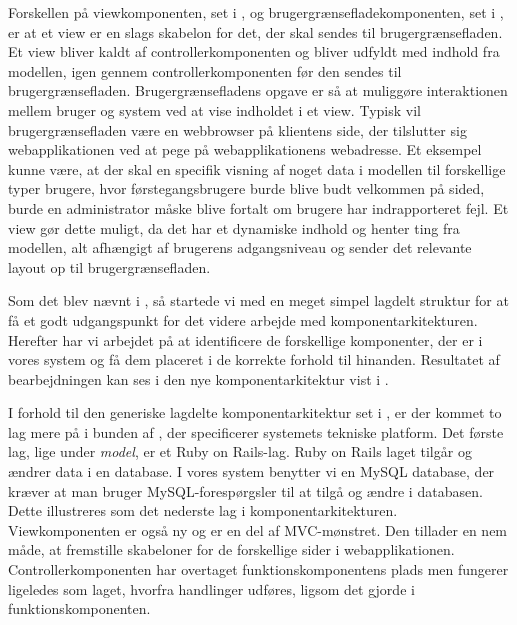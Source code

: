 
Forskellen på viewkomponenten, set i , og brugergrænsefladekomponenten, set i , er at et view er en slags skabelon for det, der skal sendes til brugergrænsefladen. Et view bliver kaldt af controllerkomponenten og bliver udfyldt med indhold fra modellen, igen gennem controllerkomponenten før den sendes til brugergrænsefladen. Brugergrænsefladens opgave er så at muliggøre interaktionen mellem bruger og system ved at vise indholdet i et view. Typisk vil brugergrænsefladen være en webbrowser på klientens side, der tilslutter sig webapplikationen ved at pege på webapplikationens webadresse. Et eksempel kunne være, at der skal en specifik visning af noget data i modellen til forskellige typer brugere, hvor førstegangsbrugere burde blive budt velkommen på sided, burde en administrator måske blive fortalt om brugere har indrapporteret fejl. Et view gør dette muligt, da det har et dynamiske indhold og henter ting fra modellen, alt afhængigt af brugerens adgangsniveau og sender det relevante layout op til brugergrænsefladen. 

Som det blev nævnt i , så startede vi med en meget simpel lagdelt struktur for at få et godt udgangspunkt for det videre arbejde med komponentarkitekturen. Herefter har vi arbejdet på at identificere de forskellige komponenter, der er i vores system og få dem placeret i de korrekte forhold til hinanden. Resultatet af bearbejdningen kan ses i den nye komponentarkitektur vist i .

I forhold til den generiske lagdelte komponentarkitektur set i , er der kommet to lag mere på i bunden af , der specificerer systemets tekniske platform. Det første lag, lige under \textit{model}, er et Ruby on Rails-lag. Ruby on Rails laget tilgår og ændrer data i en database. I vores system benytter vi en MySQL database, der kræver at man bruger MySQL-forespørgsler til at tilgå og ændre i databasen. Dette illustreres som det nederste lag i komponentarkitekturen. Viewkomponenten er også ny og er en del af MVC-mønstret. Den tillader en nem måde, at fremstille skabeloner for de forskellige sider i webapplikationen. Controllerkomponenten har overtaget funktionskomponentens plads men fungerer ligeledes som laget, hvorfra handlinger udføres, ligsom det gjorde i funktionskomponenten.

